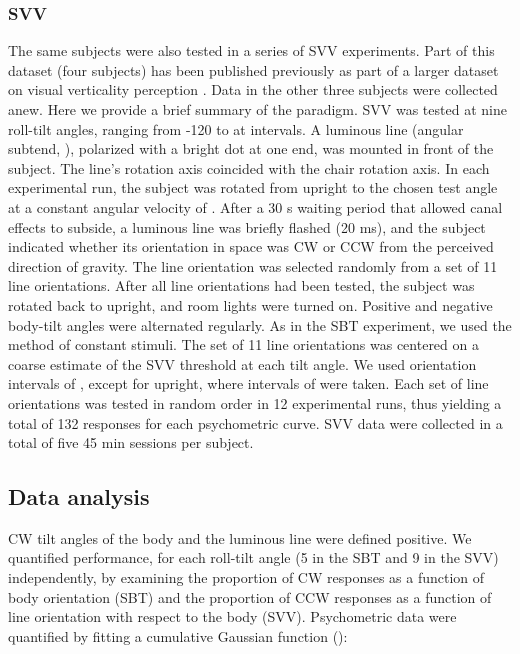 \subsubsection{SVV}
 
The same subjects were also tested in a series of SVV experiments. Part of this dataset (four subjects) has been published previously as part of a larger dataset on visual verticality perception \cite{devrijer2009}. Data in the other three subjects were collected anew. Here we provide a brief summary of the paradigm. SVV was tested at nine roll-tilt angles, ranging from -120 to  at  intervals. A luminous line (angular subtend, ), polarized with a bright dot at one end, was mounted in front of the subject. The line's rotation axis coincided with the chair rotation axis. In each experimental run, the subject was rotated from upright to the chosen test angle at a constant angular velocity of . After a 30 \si{\second} waiting period that allowed canal effects to subside, a luminous line was briefly flashed (20 \si{\milli\second}), and the subject indicated whether its orientation in space was CW or CCW from the perceived direction of gravity. The line orientation was selected randomly from a set of 11 line orientations. After all line orientations had been tested, the subject was rotated back to upright, and room lights were turned on. Positive and negative body-tilt angles were alternated regularly. As in the SBT experiment, we used the method of constant stimuli. The set of 11 line orientations was centered on a coarse estimate of the SVV threshold at each tilt angle. We used orientation intervals of , except for upright, where intervals of  were taken. Each set of line orientations was tested in random order in 12 experimental runs, thus yielding a total of 132 responses for each psychometric curve. SVV data were collected in a total of five 45 min sessions per subject. 

\subsection{Data analysis}

CW tilt angles of the body and the luminous line were defined positive. We quantified performance, for each roll-tilt angle (5 in the SBT and 9 in the SVV) independently, by examining the proportion of CW responses as a function of body orientation (SBT) and the proportion of CCW responses as a function of line orientation with respect to the body (SVV). Psychometric data were quantified by fitting a cumulative Gaussian function (): 

